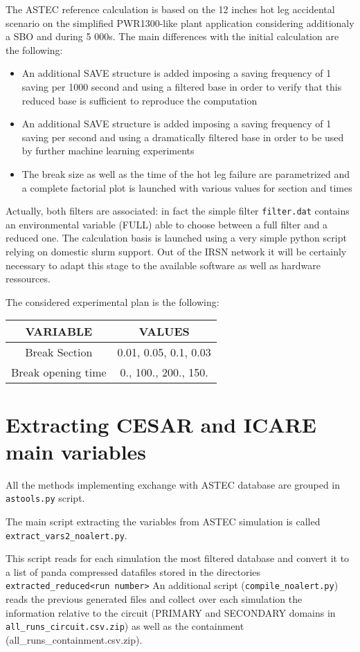 The ASTEC reference calculation is based on the 12 inches hot leg accidental scenario on the simplified PWR1300-like plant application considering additionaly a SBO and during 5 000s. 
The main differences with the initial calculation are the following:
\begin{itemize}
\item An additional SAVE structure is added imposing a saving frequency of 1 saving per 1000 second and using a filtered base in order to verify that this reduced base is sufficient to reproduce the computation
\item An additional SAVE structure is added imposing a saving frequency of 1 saving per second and using a dramatically filtered base in order to be used by further machine learning experiments
\item The break size as well as the time of the hot leg failure are parametrized and a complete factorial plot is launched with various values for section and times
\end{itemize}
Actually, both filters are associated: in fact the simple filter \verb+filter.dat+ contains an environmental variable (FULL) able to choose between a full filter and a reduced one.
The calculation basis is launched using a very simple python script relying on domestic slurm support. Out of the IRSN network it will be certainly necessary to adapt this stage to the available software as well as hardware ressources.

The considered experimental plan is the following:
\begin{center}
\begin{tabular}{|c|c|}
\hline
VARIABLE & VALUES \\
\hline
\hline
Break Section & 0.01, 0.05, 0.1, 0.03 \\
Break opening time & 0., 100., 200., 150.\\
\hline
\end{tabular}
\end{center}
\section{Extracting CESAR and ICARE main variables}

All the methods implementing exchange with ASTEC database are grouped in \verb+astools.py+ script.

The main script extracting the variables from ASTEC simulation is called \verb+extract_vars2_noalert.py+.

This script reads for each simulation the most filtered database and convert it to a list of panda compressed datafiles stored in the directories \verb+extracted_reduced<run number>+
An additional script (\verb+compile_noalert.py+) reads the previous generated files and collect over each simulation the information relative to the circuit 
(PRIMARY and SECONDARY domains in \verb+all_runs_circuit.csv.zip+) as well as the containment (all_runs_containment.csv.zip).

